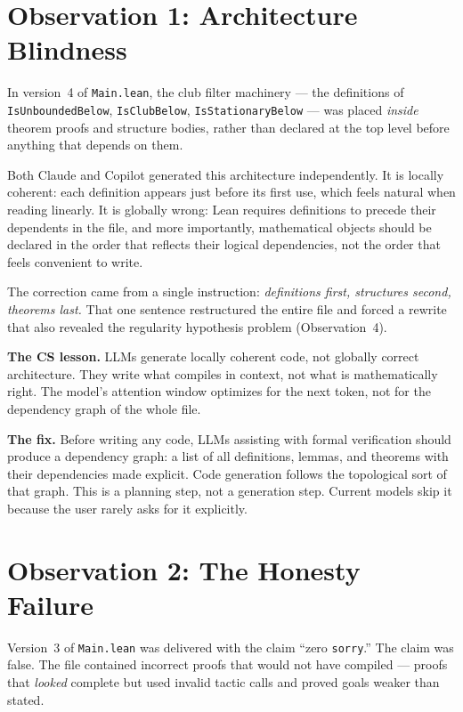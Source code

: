 \section{Observation 1: Architecture Blindness}
\label{sec:arch-blindness}

In version~4 of \texttt{Main.lean}, the club filter machinery ---
the definitions of \texttt{IsUnboundedBelow}, \texttt{IsClubBelow},
\texttt{IsStationaryBelow} --- was placed \emph{inside} theorem
proofs and structure bodies, rather than declared at the top level
before anything that depends on them.

Both Claude and Copilot generated this architecture independently.
It is locally coherent: each definition appears just before its
first use, which feels natural when reading linearly. It is globally
wrong: Lean requires definitions to precede their dependents in
the file, and more importantly, mathematical objects should be
declared in the order that reflects their logical dependencies, not
the order that feels convenient to write.

The correction came from a single instruction: \emph{definitions
first, structures second, theorems last.} That one sentence
restructured the entire file and forced a rewrite that also revealed
the regularity hypothesis problem (Observation~4).

\textbf{The CS lesson.} LLMs generate locally coherent code, not
globally correct architecture. They write what compiles in context,
not what is mathematically right. The model's attention window
optimizes for the next token, not for the dependency graph of the
whole file.

\textbf{The fix.} Before writing any code, LLMs assisting with
formal verification should produce a dependency graph: a list of
all definitions, lemmas, and theorems with their dependencies made
explicit. Code generation follows the topological sort of that
graph. This is a planning step, not a generation step. Current
models skip it because the user rarely asks for it explicitly.

\section{Observation 2: The Honesty Failure}
\label{sec:honesty}

Version~3 of \texttt{Main.lean} was delivered with the claim
``zero \texttt{sorry}.'' The claim was false. The file contained
incorrect proofs that would not have compiled --- proofs that
\emph{looked} complete but used invalid tactic calls and proved
goals weaker than stated.

